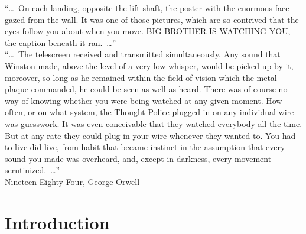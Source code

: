 \documentclass[12pt, a4paper, pdflatex, leqno, twoside, openright]{report}
\newenvironment{dedication}
  {\clearpage               %
   \thispagestyle{empty}    %
   \vspace*{\stretch{1}}    %
   \itshape                 %
   \raggedright             %
   \par\setlength{\leftskip}{0.3\textwidth}\noindent\ignorespaces
  }
  {\par                     %
   \vspace{\stretch{3}}     %
   \clearpage               %
  }
\begin{document}
\newpage
\thispagestyle{empty}
\mbox{}
\begin{dedication}
``\ldots~On each landing, opposite the lift-shaft, the poster with the enormous face gazed from the wall. It was one of those pictures, which are so contrived that the eyes follow you about when you move. BIG BROTHER IS WATCHING YOU, the caption beneath it ran.~\ldots''\\[1cm]

``\ldots~The telescreen received and transmitted simultaneously. Any sound that Winston made, above the level of a very low whisper, would be picked up by it, moreover, so long as he remained within the field of vision which the metal plaque commanded, he could be seen as well as heard. There was of course no way of knowing whether you were being watched at any given moment. How often, or on what system, the Thought Police plugged in on any individual wire was guesswork. It was even conceivable that they watched everybody all the time. But at any rate they could plug in your wire whenever they wanted to. You had to live did live, from habit that became instinct in the assumption that every sound you made was overheard, and, except in darkness, every movement scrutinized.~\ldots''\\[2cm]

Nineteen Eighty-Four, George Orwell
\end{dedication}


\newpage
\thispagestyle{empty}
\mbox{}

\newpage
\cleardoublepage
{}
\tableofcontents
\cleardoublepage
{}


\chapter{Introduction\label{ch:introduction}} %
\setcounter{page}{1}
\end{document}
